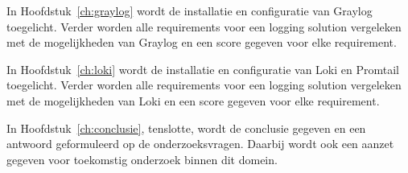 In Hoofdstuk~\ref{ch:graylog} wordt de installatie en configuratie van Graylog toegelicht. Verder worden alle requirements voor een logging solution vergeleken met de mogelijkheden van Graylog en een score gegeven voor elke requirement.

In Hoofdstuk~\ref{ch:loki} wordt de installatie en configuratie van Loki en Promtail toegelicht. Verder worden alle requirements voor een logging solution vergeleken met de mogelijkheden van Loki en een score gegeven voor elke requirement.

In Hoofdstuk~\ref{ch:conclusie}, tenslotte, wordt de conclusie gegeven en een antwoord geformuleerd op de onderzoeksvragen. Daarbij wordt ook een aanzet gegeven voor toekomstig onderzoek binnen dit domein.

